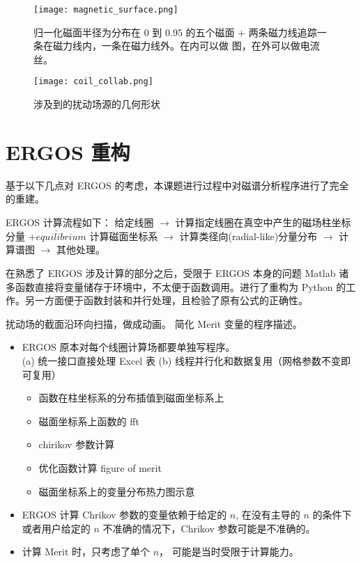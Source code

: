 \begin{figure}[htbp]
    \centering%
        \texttt{[image: magnetic\_surface.png]}
        \caption{归一化磁面半径为分布在 0 到 0.95 的五个磁面 + 两条磁力线追踪一条在磁力线内，一条在磁力线外。在内可以做 \Poincare 图，在外可以做电流丝。}
\end{figure}

\begin{figure}[htbp]
    \centering%
        \texttt{[image: coil\_collab.png]}
        \caption{涉及到的扰动场源的几何形状}
\end{figure}
  
\section{ERGOS 重构}

基于以下几点对 ERGOS 的考虑，本课题进行过程中对磁谱分析程序进行了完全的重建。

ERGOS 计算流程如下：
给定线圈 $\rightarrow$ 计算指定线圈在真空中产生的磁场柱坐标分量 $\underrightarrow{+equilibrium}$  计算磁面坐标系 $\rightarrow$ 计算类径向(radial-like)分量分布 $\rightarrow$ 计算谱图 $\rightarrow$ 其他处理。


在熟悉了 ERGOS 涉及计算的部分之后，受限于 ERGOS 本身的问题 Matlab 诸多函数直接将变量储存于环境中，不太便于函数调用。进行了重构为 Python 的工作。另一方面便于函数封装和并行处理，且检验了原有公式的正确性。

    
  扰动场的截面沿环向扫描，做成动画。
  简化 Merit 变量的程序描述。
\begin{itemize}
  \item ERGOS 原本对每个线圈计算场都要单独写程序。\\
  (a) 统一接口直接处理 Excel 表 (b) 线程并行化和数据复用（网格参数不变即可复用）
    \begin{itemize}
    \item 函数在柱坐标系的分布插值到磁面坐标系上
    \item 磁面坐标系上函数的 fft
    \item chirikov 参数计算
    \item 优化函数计算 figure of merit
    \item 磁面坐标系上的变量分布热力图示意
    \end{itemize}
\end{itemize}

\begin{itemize}
  \item ERGOS 计算 Chrikov 参数的变量依赖于给定的 $n$, 在没有主导的 $n$ 的条件下或者用户给定的 $n$ 不准确的情况下，Chrikov 参数可能是不准确的。
  \item 计算 Merit 时，只考虑了单个 $n$， 可能是当时受限于计算能力。
\end{itemize}

